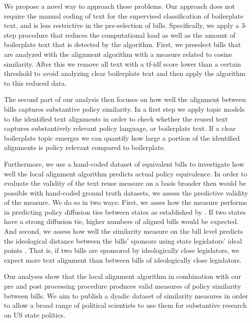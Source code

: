 \documentclass[12pt]{article} %
\begin{document}
We propose a novel way to approach these problems. Our approach does not require the manual coding of text for the supervised classification of boilerplate text, and is less restrictive in the pre-selection of bills. Specifically, we apply a 3-step procedure that reduces the computational load as well as the amount of boilerplate text that is detected by the algorithm. First, we preselect bills that are analyzed with the alignment algorithm with a measure related to cosine similarity. After this we remove all text with a tf-idf score lower than a certain threshold to avoid analyzing clear boilerplate text and then apply the algorithm to this reduced data.

The second part of our analysis then focuses on how well the alignment between bills captures substantive policy similarity. In a first step we apply topic models to the identified text alignments in order to check whether the reused text captures substantively relevant policy language, or boilerplate text. If a clear boilerplate topic emerges we can quantify how large a portion of the identified alignments is policy relevant compared to boilerplate.

Furthermore, we use a hand-coded dataset of equivalent bills to investigate how well the local alignment algorithm predicts actual policy equivalence. In order to evaluate the validity of the text reuse measure on a basis broader then would be possible with hand-coded ground truth datasets, we assess the predictive validity of the measure. We do so in two ways: First, we asses how the measure performs in predicting policy diffusion ties between states as established by \citet{desmarais2015}. If two states have a strong diffusion tie, higher numbers of aligned bills would be expected. And second, we assess how well the similarity measure on the bill level predicts the ideological distance between the bills' sponsors using state legislators' ideal points \citep{shor2011}. That is, if two bills are sponsored by ideologically close legislators, we expect more text alignment than between bills of ideologically close legislators. 

Our analyses show that the local alignment algorithm in combination with our pre and post processing procedure produces valid measures of policy similarity between bills. We aim to publish a dyadic dataset of similarity measures in order to allow a broad range of political scientists to use them for substantive research on US state politics. 

\clearpage



\end{document}
